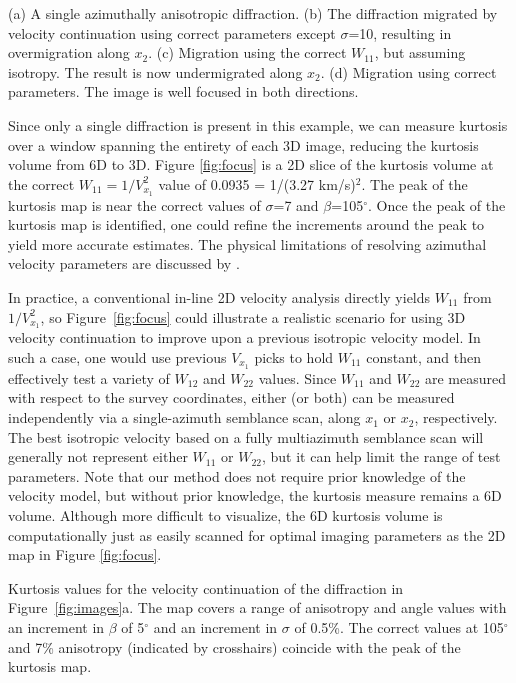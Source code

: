 {(a) A single azimuthally anisotropic diffraction. (b) The diffraction migrated by velocity continuation using correct parameters except $\sigma $=10, resulting in overmigration along $x_2$.  (c) Migration using the correct $W_{11}$, but assuming isotropy. The result is now undermigrated along $x_2$. (d) Migration using correct parameters.  The image is well focused in both directions.}

Since only a single diffraction is present in this example, we can measure kurtosis over a window spanning the entirety of each 3D image, reducing the kurtosis volume from 6D to 3D.  
Figure \ref{fig:focus} is a 2D slice of the kurtosis volume at the correct $W_{11}=1/V_{x_1}^2$ value of 0.0935 = 1/(3.27 km/s)$^2$.  
The peak of the kurtosis map is near the correct values of $\sigma $=7 and $\beta $=105$^{\circ }$.
Once the peak of the kurtosis map is identified, one could refine the increments around the peak to yield more accurate estimates.
The physical limitations of resolving azimuthal velocity parameters are discussed by \cite{GEO65-01-02220231}. 

In practice, a conventional in-line 2D velocity analysis directly yields $W_{11}$ from $1/V_{x_1}^2$, so Figure~\ref{fig:focus} could illustrate a realistic scenario for using 3D velocity continuation to improve upon a previous isotropic velocity model.  
In such a case, one would use previous $V_{x_1}$ picks to hold $W_{11}$ constant, and then effectively test a variety of $W_{12}$ and $W_{22}$ values.  
Since $W_{11}$ and $W_{22}$ are measured with respect to the survey coordinates, either (or both) can be measured independently via a single-azimuth semblance scan, along $x_1$ or $x_2$, respectively. 
The best isotropic velocity based on a fully multiazimuth semblance scan will generally not represent either $W_{11}$ or $W_{22}$, but it can help limit the range of test parameters. 
Note that our method does not require prior knowledge of the velocity model, but without prior knowledge, the kurtosis measure remains a 6D volume.  
Although more difficult to visualize, the 6D kurtosis volume is computationally just as easily scanned for optimal imaging parameters as the 2D map in Figure \ref{fig:focus}.

{Kurtosis values for the velocity continuation of the diffraction in Figure~\ref{fig:images}a.  The map covers a range of anisotropy and angle values with an increment in $\beta $ of 5$^{\circ }$ and an increment in $\sigma $ of 0.5\%.  The correct values at 105$^{\circ }$ and 7\% anisotropy (indicated by crosshairs) coincide with the peak of the kurtosis map.}

